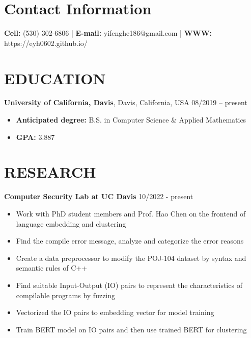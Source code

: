 \documentclass[margin,line]{res}
\begin{document}

\begin{resume}
\section{\sc Contact Information}
\vspace{.05in}
\textbf{Cell:} (530) 302-6806 |
\textbf{E-mail:} yifenghe186@gmail.com |
\textbf{WWW:} https://eyh0602.github.io/



\section{\sc EDUCATION}
\textbf{University of California, Davis}, Davis, California, USA \hfill {08/2019 -- present} \\
\begin{itemize}
	\item \textbf{Anticipated degree:} B.S. in Computer Science \& Applied Mathematics
	\item \textbf{GPA:} 3.887
\end{itemize}

\section{\sc RESEARCH}
\textbf{Computer Security Lab at UC Davis} \hfill 10/2022 - present \\
\begin{itemize}
	\item Work with PhD student members and Prof. Hao Chen on the frontend of language embedding and clustering 
	\item Find the compile error message, analyze and categorize the error reasons 
	\item Create a data preprocessor to modify the POJ-104 dataset by syntax and semantic rules of C++ 
	\item Find suitable Input-Output (IO) pairs to represent the characteristics of compilable programs by fuzzing
	\item Vectorized the IO pairs to embedding vector for model training 
	\item Train BERT model on IO pairs and then use trained BERT for clustering 
\end{itemize}


\end{resume}
\end{document}

